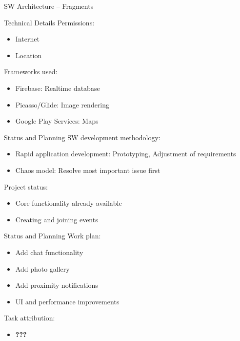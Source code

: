 \documentclass[logo=EURECOM,english]{eurecombeamer}
\newcommand{\todo}[1]{\textbf{\color{red} #1}}
\begin{document}
\begin{frame}{SW Architecture -- Fragments}
\end{frame}

\begin{frame}{Technical Details}
Permissions:
\begin{itemize}
\item Internet
\item Location\bigskip
\end{itemize}
Frameworks used:
\begin{itemize}
\item Firebase: Realtime database
\item Picasso/Glide: Image rendering
\item Google Play Services: Maps
\end{itemize}
\end{frame}

\begin{frame}{Status and Planning}
SW development methodology:
\begin{itemize}
\item Rapid application development: Prototyping, Adjustment of requirements
\item Chaos model: Resolve most important issue first\bigskip
\end{itemize}
Project status:
\begin{itemize}
\item Core functionality already available
\item Creating and joining events
\end{itemize}
\end{frame}

\begin{frame}{Status and Planning}
Work plan:
\begin{itemize}
\item Add chat functionality
\item Add photo gallery
\item Add proximity notifications
\item UI and performance improvements\bigskip
\end{itemize}
Task attribution:
\begin{itemize}
\item \todo{???}
\end{itemize}
\end{frame}

\begin{frame}
\end{frame}

\begin{frame}
\end{frame}
\end{document}
